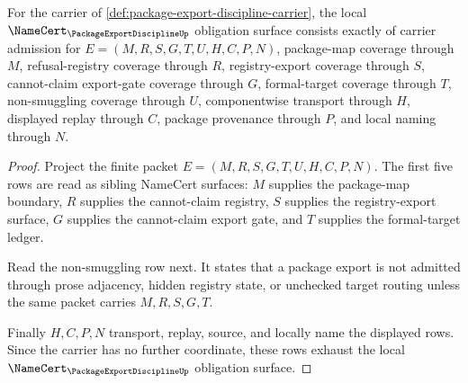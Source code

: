 \begin{theorem}
\label{thm:package-export-discipline-namecert-obligations}
For the carrier of \autoref{def:package-export-discipline-carrier}, the local $\NameCert_{\PackageExportDisciplineUp}$ obligation surface consists exactly of carrier admission for $E=(M,R,S,G,T,U,H,C,P,N)$, package-map coverage through $M$, refusal-registry coverage through $R$, registry-export coverage through $S$, cannot-claim export-gate coverage through $G$, formal-target coverage through $T$, non-smuggling coverage through $U$, componentwise transport through $H$, displayed replay through $C$, package provenance through $P$, and local naming through $N$.
\end{theorem}
\begin{proof}
Project the finite packet $E=(M,R,S,G,T,U,H,C,P,N)$. The first five rows are read as sibling NameCert surfaces: $M$ supplies the package-map boundary, $R$ supplies the cannot-claim registry, $S$ supplies the registry-export surface, $G$ supplies the cannot-claim export gate, and $T$ supplies the formal-target ledger.

Read the non-smuggling row next. It states that a package export is not admitted through prose adjacency, hidden registry state, or unchecked target routing unless the same packet carries $M,R,S,G,T$.

Finally $H,C,P,N$ transport, replay, source, and locally name the displayed rows. Since the carrier has no further coordinate, these rows exhaust the local $\NameCert_{\PackageExportDisciplineUp}$ obligation surface.
\end{proof}

